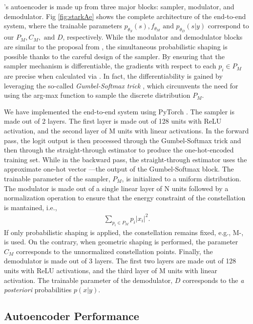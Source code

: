 \citeauthor{Stark}'s autoencoder is made up from three major blocks: sampler, modulator, and demodulator. Fig \ref{fig:starkAe} shows the complete architecture of the end-to-end system, where the trainable parameters $p_{\theta_S}(s), f_{\theta_M} \text{ and } p_{\theta_D}(s|y)$ correspond to our $P_M, C_M, \text{ and } D$, respectively. While the modulator and demodulator blocks are similar to the proposal from \cite{O'Shea}, the simultaneous probabilistic shaping is possible thanks to the careful design of the sampler. By ensuring that the sampler mechanism is differentiable, the gradients with respect to each $p_i \in P_M$ are precise when calculated via . In fact, the differentiability is gained by leveraging the so-called \textit{Gumbel-Softmax trick} \cite{JANG}, which circunvents the need for using the arg-max function to sample the discrete distribution $P_M$.

We have implemented the end-to-end system using PyTorch \cite{PyTorch}. The sampler is made out of 2 layers. The first layer is made out of 128 units with ReLU activation, and the second layer of M units with linear activations. In the forward pass, the logit output is then processed through the Gumbel-Softmax trick and then through the straight-through estimator to produce the one-hot-encoded training set. While in the backward pass, the straight-through estimator uses the approximate one-hot vector ---the output of the Gumbel-Softmax block.  The trainable parameter of the sampler, $P_M$, is initialized to a uniform distribution.
The modulator is made out of a single linear layer of N units followed by a normalization operation to ensure that the energy constraint of the constellation is mantained, i.e.,
\begin{align}
	\sum\limits_{p_i \in P_M} p_i |x_i|^2.
\end{align}
If only probabilistic shaping is applied, the constellation remains fixed, e.g., M-, is used. On the contrary, when geometric shaping is performed, the parameter $C_M$ corresponds to the unnormalized constellation points.
Finally, the demodulator is made out of 3 layers. The first two layers are made out of 128 units with ReLU activations, and the third layer of M units with linear activation. The trainable parameter of the demodulator, $D$ corresponds to the \textit{a posteriori} probabilities $p(x|y)$.



\subsection{Autoencoder Performance}

